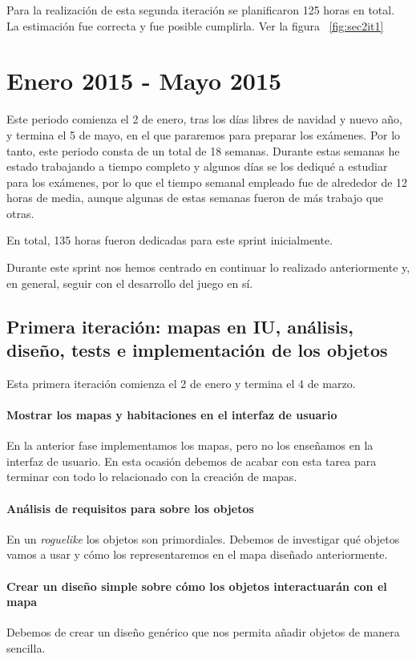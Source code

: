 Para la realización de esta segunda iteración se planificaron 125 horas en total. La estimación fue correcta y fue posible cumplirla. Ver la figura ~\ref{fig:sec2it1}

\section{Enero 2015 - Mayo 2015}

Este periodo comienza el 2 de enero, tras los días libres de navidad y nuevo año, y termina el 5 de mayo, en el que pararemos para preparar los exámenes. Por lo tanto, este periodo consta de un total de 18 semanas. Durante estas semanas he estado trabajando a tiempo completo y algunos días se los dediqué a estudiar para los exámenes, por lo que el tiempo semanal empleado fue de alrededor de 12 horas de media, aunque algunas de estas semanas fueron de más trabajo que otras.

En total, 135 horas fueron dedicadas para este sprint inicialmente.

Durante este sprint nos hemos centrado en continuar lo realizado anteriormente y, en general, seguir con el desarrollo del juego en sí.

\subsection{Primera iteración: mapas en IU, análisis, diseño, tests e implementación de los objetos}

Esta primera iteración comienza el 2 de enero y termina el 4 de marzo.

\paragraph{Mostrar los mapas y habitaciones en el interfaz de usuario} En la anterior fase implementamos los mapas, pero no los enseñamos en la interfaz de usuario. En esta ocasión debemos de acabar con esta tarea para terminar con todo lo relacionado con la creación de mapas.

\paragraph{Análisis de requisitos para sobre los objetos} En un \textit{roguelike} los objetos son primordiales. Debemos de investigar qué objetos vamos a usar y cómo los representaremos en el mapa diseñado anteriormente.

\paragraph{Crear un diseño simple sobre cómo los objetos interactuarán con el mapa} Debemos de crear un diseño genérico que nos permita añadir objetos de manera sencilla.

